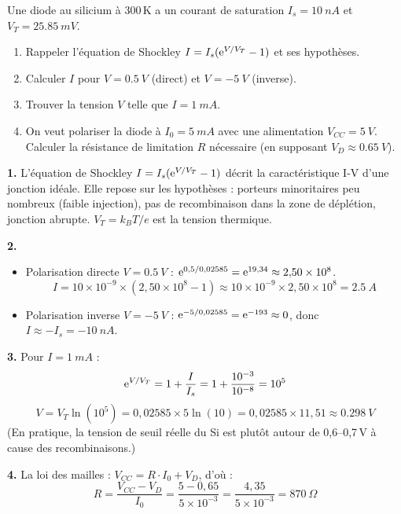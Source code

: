 \documentclass[12pt,a4paper]{article}
\begin{document}
\begin{boiteexercice}
Une diode au silicium à 300\,K a un courant de saturation $I_s = \qty{10}{nA}$ et $V_T = \qty{25.85}{mV}$.
\begin{enumerate}
  \item Rappeler l'équation de Shockley $I = I_s(\mathrm{e}^{V/V_T}-1)$ et ses hypothèses.
  \item Calculer $I$ pour $V = \qty{0.5}{V}$ (direct) et $V = \qty{-5}{V}$ (inverse).
  \item Trouver la tension $V$ telle que $I = \qty{1}{mA}$.
  \item On veut polariser la diode à $I_0 = \qty{5}{mA}$ avec une alimentation $V_{CC} = \qty{5}{V}$. Calculer la résistance de limitation $R$ nécessaire (en supposant $V_D \approx \qty{0.65}{V}$).
\end{enumerate}
\end{boiteexercice}

\begin{boitecorrige}
\textbf{1.} L'équation de Shockley $I = I_s(\mathrm{e}^{V/V_T}-1)$ décrit la caractéristique I-V d'une jonction idéale. Elle repose sur les hypothèses : porteurs minoritaires peu nombreux (faible injection), pas de recombinaison dans la zone de déplétion, jonction abrupte. $V_T = k_BT/e$ est la tension thermique.

\textbf{2.}
\begin{itemize}[nosep]
  \item Polarisation directe $V = \qty{0.5}{V}$ : $\mathrm{e}^{0{,}5/0{,}02585} = \mathrm{e}^{19{,}34} \approx 2{,}50\times10^8$.
  \[
  I = 10\times10^{-9}\times(2{,}50\times10^8 - 1) \approx 10\times10^{-9}\times2{,}50\times10^8 = \qty{2.5}{A}
  \]
  \item Polarisation inverse $V = \qty{-5}{V}$ : $\mathrm{e}^{-5/0{,}02585} = \mathrm{e}^{-193} \approx 0$, donc $I \approx -I_s = \qty{-10}{nA}$.
\end{itemize}

\textbf{3.} Pour $I = \qty{1}{mA}$ :
\[
\mathrm{e}^{V/V_T} = 1 + \frac{I}{I_s} = 1 + \frac{10^{-3}}{10^{-8}} = 10^5
\]
\[
V = V_T\ln(10^5) = 0{,}02585\times5\ln(10) = 0{,}02585\times11{,}51 \approx \boxed{\qty{0.298}{V}}
\]
(En pratique, la tension de seuil réelle du Si est plutôt autour de 0,6--0,7\,V à cause des recombinaisons.)

\textbf{4.} La loi des mailles : $V_{CC} = R\cdot I_0 + V_D$, d'où :
\[
R = \frac{V_{CC} - V_D}{I_0} = \frac{5 - 0{,}65}{5\times10^{-3}} = \frac{4{,}35}{5\times10^{-3}} = \boxed{\qty{870}{\Omega}}
\]
\end{boitecorrige}
\end{document}
